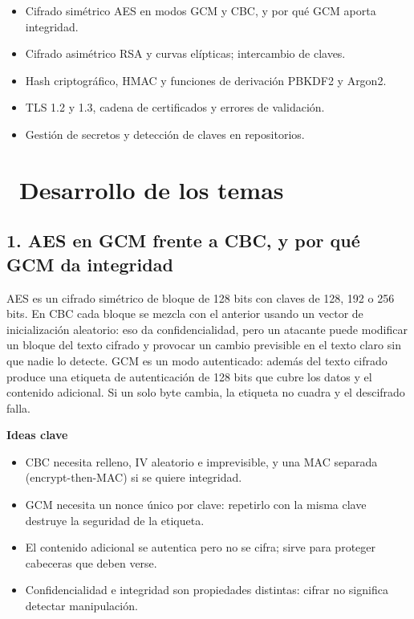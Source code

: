 \documentclass[11pt,a4paper]{article}
\newcommand{\iconotexto}[2]{\textcolor{cyanNeon}{\faIcon{#1}}~#2}
\begin{document}
\begin{itemize}[leftmargin=1.4em,itemsep=2pt,topsep=3pt]
  \item Cifrado simétrico AES en modos GCM y CBC, y por qué GCM aporta integridad.
  \item Cifrado asimétrico RSA y curvas elípticas; intercambio de claves.
  \item Hash criptográfico, HMAC y funciones de derivación PBKDF2 y Argon2.
  \item TLS 1.2 y 1.3, cadena de certificados y errores de validación.
  \item Gestión de secretos y detección de claves en repositorios.
\end{itemize}

\section{\iconotexto{brain}{Desarrollo de los temas}}


\subsection{1. AES en GCM frente a CBC, y por qué GCM da integridad}

AES es un cifrado simétrico de bloque de 128 bits con claves de 128, 192 o 256 bits. En CBC cada bloque se mezcla con el anterior usando un vector de inicialización aleatorio: eso da confidencialidad, pero un atacante puede modificar un bloque del texto cifrado y provocar un cambio previsible en el texto claro sin que nadie lo detecte. GCM es un modo autenticado: además del texto cifrado produce una etiqueta de autenticación de 128 bits que cubre los datos y el contenido adicional. Si un solo byte cambia, la etiqueta no cuadra y el descifrado falla.

\textbf{Ideas clave}

\begin{itemize}[leftmargin=1.4em,itemsep=2pt,topsep=3pt]
  \item CBC necesita relleno, IV aleatorio e imprevisible, y una MAC separada (encrypt-then-MAC) si se quiere integridad.
  \item GCM necesita un nonce único por clave: repetirlo con la misma clave destruye la seguridad de la etiqueta.
  \item El contenido adicional se autentica pero no se cifra; sirve para proteger cabeceras que deben verse.
  \item Confidencialidad e integridad son propiedades distintas: cifrar no significa detectar manipulación.
\end{itemize}
\end{document}
